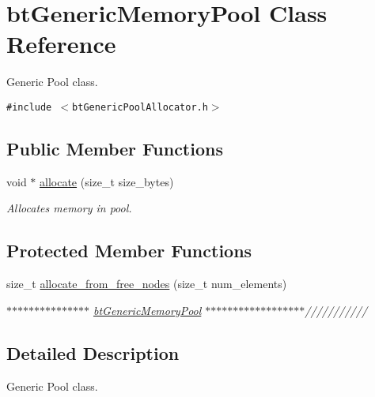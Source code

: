 \hypertarget{classbt_generic_memory_pool}{
\section{btGenericMemoryPool Class Reference}
\label{classbt_generic_memory_pool}
}
Generic Pool class.  


{\tt \#include $<$btGenericPoolAllocator.h$>$}

\subsection*{Public Member Functions}
\begin{CompactItemize}
\item 
void $\ast$ \hyperlink{classbt_generic_memory_pool_cd47d75d6fbd7dbf6f0d7849e0bd9ec1}{allocate} (size\_\-t size\_\-bytes)
\begin{CompactList}\small\item\em Allocates memory in pool. \item\end{CompactList}\end{CompactItemize}
\subsection*{Protected Member Functions}
\begin{CompactItemize}
\item 
\hypertarget{classbt_generic_memory_pool_b3d627fdeb0178314779ba9b2361462a}{
size\_\-t \hyperlink{classbt_generic_memory_pool_b3d627fdeb0178314779ba9b2361462a}{allocate\_\-from\_\-free\_\-nodes} (size\_\-t num\_\-elements)}
\label{classbt_generic_memory_pool_b3d627fdeb0178314779ba9b2361462a}

\begin{CompactList}\small\item\em $\ast$$\ast$$\ast$$\ast$$\ast$$\ast$$\ast$$\ast$$\ast$$\ast$$\ast$$\ast$$\ast$$\ast$$\ast$ \hyperlink{classbt_generic_memory_pool}{btGenericMemoryPool} $\ast$$\ast$$\ast$$\ast$$\ast$$\ast$$\ast$$\ast$$\ast$$\ast$$\ast$$\ast$$\ast$$\ast$$\ast$$\ast$$\ast$$\ast$/////////// \item\end{CompactList}\end{CompactItemize}


\subsection{Detailed Description}
Generic Pool class. 

